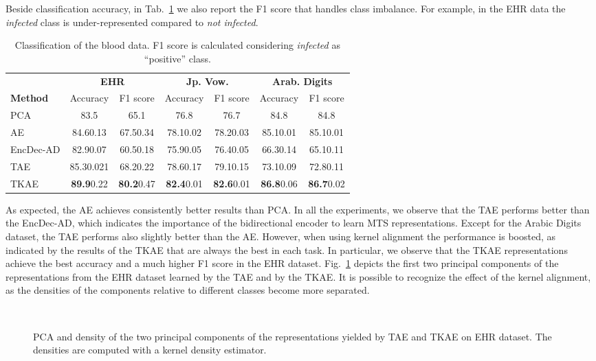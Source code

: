 \documentclass[a4paper,10pt,pdftex]{article}
\begin{document}
Beside classification accuracy, in Tab.~\ref{tab:blood} we also report the F1 score that handles class imbalance.
For example, in the EHR data the \textit{infected} class is under-represented compared to \textit{not infected}.

\bgroup
\def\arraystretch{0.95} \setlength\tabcolsep{.4em} \begin{table}[!ht]
\small
\centering
\caption{Classification of the blood data. F1 score is calculated considering \textit{infected} as ``positive'' class.}
\label{tab:blood}
\begin{tabular}{lcccccc}
\cmidrule[1.5pt]{1-7}
 & \multicolumn{2}{c}{\textbf{EHR}} & \multicolumn{2}{c}{\textbf{Jp. Vow.}} & \multicolumn{2}{c}{\textbf{Arab. Digits}}\\
\textbf{Method} & Accuracy & F1 score & Accuracy & F1 score & Accuracy & F1 score \\
\cmidrule[.5pt]{1-7}
PCA         & 83.5 & 65.1 & 76.8 & 76.7 & 84.8 & 84.8 \\
AE          & 84.60.13 & 67.50.34 & 78.10.02 & 78.20.03 & 85.10.01 & 85.10.01 \\ 
EncDec-AD   & 82.90.07 & 60.50.18 & 75.90.05 & 76.40.05 & 66.30.14 & 65.10.11 \\
TAE         & 85.30.021 & 68.20.22 & 78.60.17 & 79.10.15 & 73.10.09 & 72.80.11\\	
TKAE        & \textbf{89.9}0.22 & \textbf{80.2}0.47 & \textbf{82.4}0.01 & \textbf{82.6}0.01 & \textbf{86.8}0.06 & \textbf{86.7}0.02 \\
\cmidrule[1.5pt]{1-7}
\end{tabular}
\end{table}
\egroup


As expected, the AE achieves consistently better results than PCA.
In all the experiments, we observe that the TAE performs better than the EncDec-AD, which indicates the importance of the bidirectional encoder to learn MTS representations.
Except for the Arabic Digits dataset, the TAE performs also slightly better than the AE. 
However, when using kernel alignment the performance is boosted, as indicated by the results of the TKAE that are always the best in each task.
In particular, we observe that the TKAE representations achieve the best accuracy and a much higher F1 score in the EHR dataset.
Fig.~\ref{fig:pca_blood} depicts the first two principal components of the representations from the EHR dataset learned by the TAE and by the TKAE.
It is possible to recognize the effect of the kernel alignment, as the densities of the components relative to different classes become more separated.
\begin{figure}[ht!]
	\centering
	~
\caption{PCA and density of the two principal components of the representations yielded by TAE and TKAE on EHR dataset. The densities are computed with a kernel density estimator.}
	\label{fig:pca_blood}
\end{figure}
\end{document}
